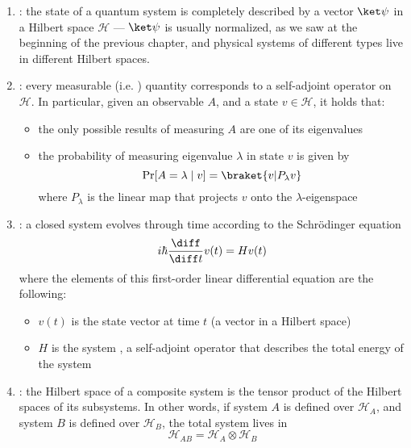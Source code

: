 \documentclass[a4paper, 12pt]{report}
\begin{document}
\begin{enumerate}
	\item {}: the state of a quantum system is completely described by a vector $\ket \psi$ in a Hilbert space $\mathcal H$ --- $\ket \psi$ is usually normalized, as we saw at the beginning of the previous chapter, and physical systems of different types live in different Hilbert spaces.
	\item {}: every measurable (i.e. ) quantity corresponds to a self-adjoint operator on $\mathcal H$. In particular, given an observable $A$, and a state $v \in \mathcal H$, it holds that:
            \begin{itemize}
                \item the only possible results of measuring $A$ are one of its eigenvalues
                \item the probability of measuring eigenvalue $\lambda$ in state $v$ is given by $$\Pr[A = \lambda \mid v] = \braket{v|P_\lambda v}$$ where $P_\lambda$ is the linear map that projects $v$ onto the $\lambda$-eigenspace
            \end{itemize}
        \item {}: a closed system evolves through time according to the Schrödinger equation $$i \hbar \dfrac{\diff}{\diff t} v(t) = Hv(t)$$ where the elements of this first-order linear differential equation are the following:

            \begin{itemize}
                \item $v(t)$ is the state vector at time $t$ (a vector in a Hilbert space)
                \item $H$ is the system , a self-adjoint operator that describes the total energy of the system
            \end{itemize}
        \item {}: the Hilbert space of a composite system is the tensor product of the Hilbert spaces of its subsystems. In other words, if system $A$ is defined over $\mathcal H_A$, and system $B$ is defined over $\mathcal H_B$, the total system lives in $$\mathcal H_{AB} = \mathcal H_A \otimes \mathcal H_B$$
\end{enumerate}
\end{document}
